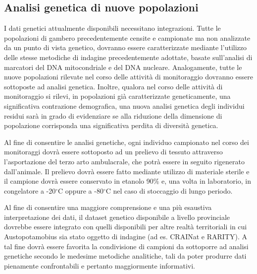 \documentclass[11pt,a4paper,italian,twoside,openany]{memoir}
\begin{document}
\subsection{Analisi genetica di nuove popolazioni} 
I dati genetici attualmente disponibili necessitano integrazioni. Tutte le popolazioni di gambero precedentemente censite e campionate ma non analizzate da un punto di vista genetico, dovranno essere caratterizzate mediante l'utilizzo delle stesse metodiche di indagine precedentemente adottate, basate sull'analisi di marcatori del DNA mitocondriale e del DNA nucleare. Analogamente, tutte le nuove popolazioni rilevate nel corso delle attività di monitoraggio dovranno essere sottoposte ad analisi genetica. Inoltre, qualora nel corso delle attività di monitoraggio si rilevi, in popolazioni già caratterizzate geneticamente, una significativa contrazione demografica, una nuova analisi genetica degli individui residui sarà in grado di evidenziare se alla riduzione della dimensione di popolazione corrisponda una significativa perdita di diversità genetica.

Al fine di consentire le analisi genetiche, ogni individuo campionato nel corso dei monitoraggi dovrà essere sottoposto ad un prelievo di tessuto attraverso l'asportazione del terzo arto ambulacrale, che potrà essere in seguito rigenerato dall'animale. Il prelievo dovrà essere fatto mediante utilizzo di materiale sterile e il campione dovrà essere conservato in etanolo 90\% e, una volta in laboratorio, in congelatore a -20$^{\circ}$C oppure a -80$^{\circ}$C nel caso di stoccaggio di lungo periodo.

Al fine di consentire una maggiore comprensione e una più esaustiva interpretazione dei dati, il dataset genetico disponibile a livello provinciale dovrebbe essere integrato con quelli disponibili per altre realtà territoriali in cui Austopotamobius sia stato oggetto di indagine (ad es. CRAINat e RARITY). A tal fine dovrà essere favorita la condivisione di campioni da sottoporre ad analisi genetiche secondo le medesime metodiche analitiche, tali da poter produrre dati pienamente confrontabili e pertanto maggiormente informativi.
\end{document}
